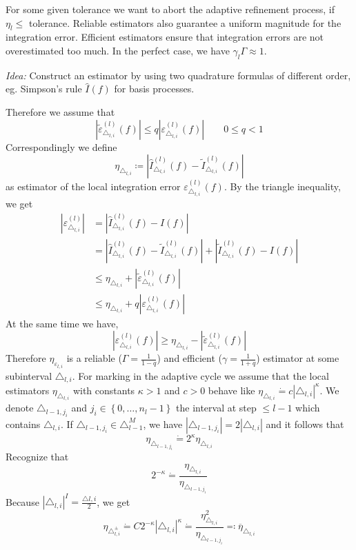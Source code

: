 \documentclass[a4paper]{article}
\numberwithin{lecref}{section}
\theoremstyle{break}
\newcommand{\Abs}[1]{\left|#1\right|}
\newcommand{\Set}[1]{\left\{#1\right\}}
\begin{document}
For some given tolerance we want to abort the adaptive refinement process, if $\eta_{l} \leq$ tolerance. Reliable estimators also guarantee a uniform magnitude for the integration error. Efficient estimators ensure that integration errors are not overestimated too much. In the perfect case, we have $\gamma_l \Gamma \approx 1$.

\emph{Idea:} Construct an estimator by using two quadrature formulas of different order, eg. Simpson's rule $\hat{I}(f)$ for basis processes.

Therefore we assume that
\[ \Abs{\tilde\varepsilon_{\triangle_{l,i}}^{(l)}(f)} \leq q \Abs{\varepsilon_{\triangle_{l,i}}^{(l)}(f)} \qquad 0 \leq q < 1 \]
Correspondingly we define
\[ \eta_{\triangle_{l,i}} \coloneqq \Abs{\hat{I}_{\triangle_{l,i}}^{(l)}(f) - \tilde I_{\triangle_{l,i}}^{(l)}(f)} \]
as estimator of the local integration error $\varepsilon_{\triangle_{l,i}}^{(l)}(f)$. By the triangle inequality, we get
\begin{align*}
  \Abs{\varepsilon_{\triangle_{l,i}}^{(l)}}
    &= \Abs{\hat I_{\triangle_{l,i}}^{(l)}(f) - I(f)} \\
    &= \Abs{\hat I_{\triangle_{l,i}}^{(l)}(f) - \tilde I_{\triangle_{l,i}}^{(l)}(f)} + \Abs{\tilde I_{\triangle_{l,i}}^{(l)}(f) - I(f)} \\
    &\leq \eta_{\triangle_{l,i}} + \Abs{\tilde \varepsilon_{\triangle_{l,i}}^{(l)}(f)} \\
    &\leq \eta_{\triangle_{l,i}} + q \Abs{\varepsilon_{\triangle_{l,i}}^{(l)}(f)}
\end{align*}
At the same time we have,
\[ \Abs{\varepsilon_{\triangle_{l,i}}^{(l)}(f)} \geq \eta_{\triangle_{l,i}} - \Abs{\tilde\varepsilon_{\triangle_{l,i}}^{(l)}(f)} \]
Therefore $\eta_{\varepsilon_{l,i}}$ is a reliable ($\Gamma = \frac1{1-q}$) and efficient ($\gamma = \frac1{1 + q}$) estimator at some subinterval $\triangle_{l,i}$. For marking in the adaptive cycle we assume that the local estimators $\eta_{\triangle_{l,i}}$ with constants $\kappa > 1$ and $c > 0$ behave like $\eta_{\triangle_{l,i}} \dot{=} c\Abs{\triangle_{l,i}}^\kappa$. We denote $\triangle_{l-1,j_i}$ and $j_i \in \Set{0, \dots, n_l-1}$ the interval at step $\leq l-1$ which contains $\triangle_{l,i}$. If $\triangle_{l-1,j_i} \in \triangle_{l-1}^M$, we have $\Abs{\triangle_{l-1,j_i}} = 2 \Abs{\triangle_{l,i}}$ and it follows that 
\[ \eta_{\triangle_{l-1,j_i}} \dot{=} 2^\kappa \eta_{\triangle_{l,i}} \]
Recognize that
\[ 2^{-\kappa} \dot{=} \frac{\eta_{\triangle_{l,i}}}{\eta_{\triangle_{l-1,j_i}}} \]
Because $\Abs{\triangle_{l,i}}^{I} = \frac{\triangle{l,i}}{2}$, we get
\[ \eta_{\triangle_{l,i}^{\pm}} \dot{=} C 2^{-\kappa} \Abs{\triangle_{l,i}}^\kappa \dot{=} \frac{\eta_{\triangle_{l,i}}^2}{\eta_{\triangle_{l-1,j_i}}} \eqqcolon \overline{\eta}_{\triangle_{l,i}} \]
\end{document}
